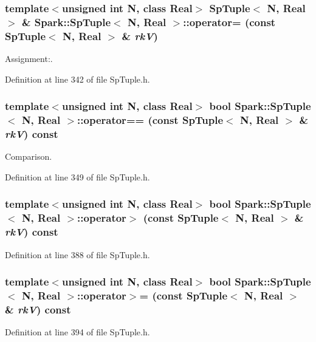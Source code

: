 \subsubsection{\setlength{\rightskip}{0pt plus 5cm}template$<$unsigned int N, class Real$>$ {\bf Sp\-Tuple}$<$ N, Real $>$ \& {\bf Spark::Sp\-Tuple}$<$ N, Real $>$::operator= (const {\bf Sp\-Tuple}$<$ N, Real $>$ \& {\em rk\-V})}\label{classSpark_1_1SpTuple_a8}


Assignment:. 

Definition at line 342 of file Sp\-Tuple.h.
\subsubsection{\setlength{\rightskip}{0pt plus 5cm}template$<$unsigned int N, class Real$>$ bool {\bf Spark::Sp\-Tuple}$<$ N, Real $>$::operator== (const {\bf Sp\-Tuple}$<$ N, Real $>$ \& {\em rk\-V}) const}\label{classSpark_1_1SpTuple_a9}


Comparison. 

Definition at line 349 of file Sp\-Tuple.h.
\subsubsection{\setlength{\rightskip}{0pt plus 5cm}template$<$unsigned int N, class Real$>$ bool {\bf Spark::Sp\-Tuple}$<$ N, Real $>$::operator$>$ (const {\bf Sp\-Tuple}$<$ N, Real $>$ \& {\em rk\-V}) const}\label{classSpark_1_1SpTuple_a13}


Definition at line 388 of file Sp\-Tuple.h.
\subsubsection{\setlength{\rightskip}{0pt plus 5cm}template$<$unsigned int N, class Real$>$ bool {\bf Spark::Sp\-Tuple}$<$ N, Real $>$::operator$>$= (const {\bf Sp\-Tuple}$<$ N, Real $>$ \& {\em rk\-V}) const}\label{classSpark_1_1SpTuple_a14}


Definition at line 394 of file Sp\-Tuple.h.
